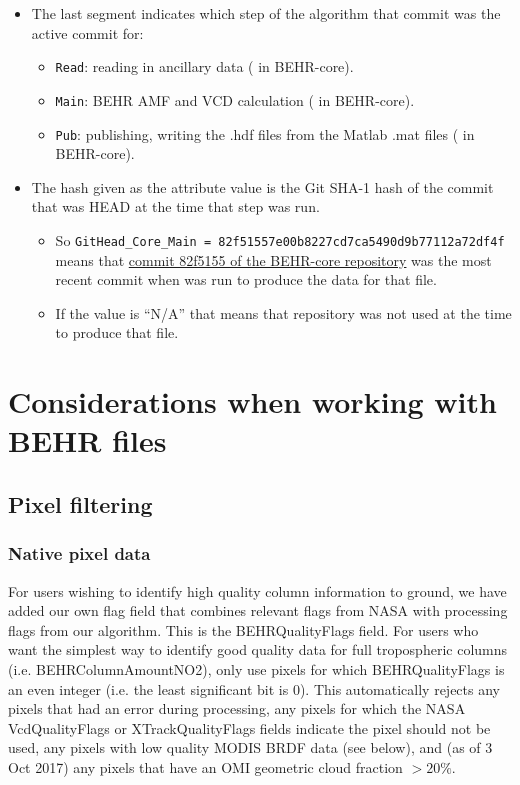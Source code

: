 \documentclass[12pt]{article}
\begin{document}
\begin{itemize}
\begin{itemize}
		\item The last segment indicates which step of the algorithm that commit was the active commit for:
			\begin{itemize}
			\item \lstinline$Read$: reading in ancillary data ( in BEHR-core).
			\item \lstinline$Main$: BEHR AMF and VCD  calculation ( in BEHR-core).
			\item \lstinline$Pub$: publishing, writing the .hdf files from the Matlab .mat files ( in BEHR-core).
			\end{itemize}
			
		\item The hash given as the attribute value is the Git SHA-1 hash of the commit that was HEAD at the time that step was run.
			\begin{itemize}
			\item So \lstinline$GitHead_Core_Main = 82f51557e00b8227cd7ca5490d9b77112a72df4f$ means that \href{https://github.com/CohenBerkeleyLab/BEHR-core/commit/82f51557e00b8227cd7ca5490d9b77112a72df4f}{commit 82f5155 of the BEHR-core repository} was the most recent commit when  was run to produce the data for that file.
			\item If the value is ``N/A'' that means that repository was not used at the time to produce that file.
			\end{itemize}
		\end{itemize}
	\end{itemize}

\FloatBarrier

\section{Considerations when working with BEHR files}
	\subsection{Pixel filtering}
	\subsubsection{Native pixel data} \label{sec:native-filtering}
	
	For users wishing to identify high quality  column information to ground, we have added our own flag field that combines relevant flags from NASA with processing flags from our algorithm. This is the BEHRQualityFlags field.  For users who want the simplest way to identify good quality data for full tropospheric columns (i.e. BEHRColumnAmountNO2), only use pixels for which BEHRQualityFlags is an even integer (i.e. the least significant bit is 0). This automatically rejects any pixels that had an error during processing, any pixels for which the NASA VcdQualityFlags or XTrackQualityFlags fields indicate the pixel should not be used, any pixels with low quality MODIS BRDF data (see below), and (as of 3 Oct 2017) any pixels that have an OMI geometric cloud fraction $> 20\%$.
	
\end{document}
